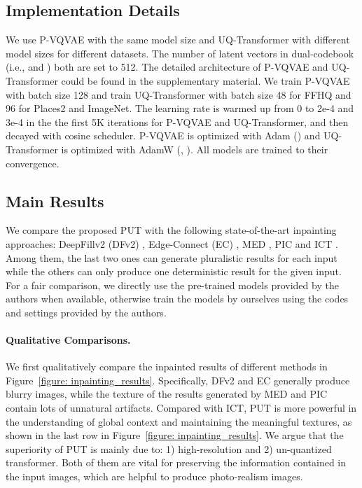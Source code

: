 \documentclass[10pt,twocolumn,letterpaper]{article}
\newcommand{\Fref}[1]{Figure~\ref{#1}}
\begin{document}
\subsection{Implementation Details}
\label{sec: implementation_details}
We use P-VQVAE with the same model size and UQ-Transformer with different model sizes for different datasets. The number of latent vectors in dual-codebook (i.e., and ) both are set to 512. The detailed architecture of P-VQVAE and UQ-Transformer could be found in the supplementary material.
We train P-VQVAE with batch size 128 and train UQ-Transformer with batch size 48 for FFHQ and 96 for Places2 and ImageNet.
The learning rate is warmed up from 0 to 2e-4 and 3e-4 in the the first 5K iterations for P-VQVAE and UQ-Transformer, and then decayed with cosine scheduler.
P-VQVAE is optimized with Adam \cite{kingma2014adam} () and UQ-Transformer is optimized with AdamW \cite{loshchilov2017decoupled} (, ). All models are trained to their convergence.











\subsection{Main Results}
\label{sec: comparison_with_other_methods}

We compare the proposed PUT with the following state-of-the-art inpainting approaches: DeepFillv2 (DFv2) \cite{yu2019free}, Edge-Connect (EC) \cite{nazeri2019edgeconnect}, MED \cite{liu2020rethinking}, PIC \cite{zheng2019pluralistic} and ICT \cite{wan2021high}. Among them, the last two ones can generate pluralistic results for each input while the others can only produce one deterministic result for the given input. For a fair comparison, we directly use the pre-trained models provided by the authors when available, otherwise train the models by ourselves using the codes and settings provided by the authors.

\paragraph{Qualitative Comparisons.} We first qualitatively compare the inpainted results of different methods in \Fref{figure: inpainting_results}. 
Specifically,  DFv2 and EC generally produce blurry images, while the texture of the results generated by MED and PIC contain lots of unnatural artifacts. Compared with ICT, PUT is more powerful in the understanding of global context and maintaining the meaningful textures, as shown in the last row in \Fref{figure: inpainting_results}.
We argue that the superiority of PUT is mainly due to: 1) high-resolution and 2) un-quantized transformer. Both of them are vital for preserving the information contained in the input images, which are helpful to produce photo-realism images.
\end{document}
